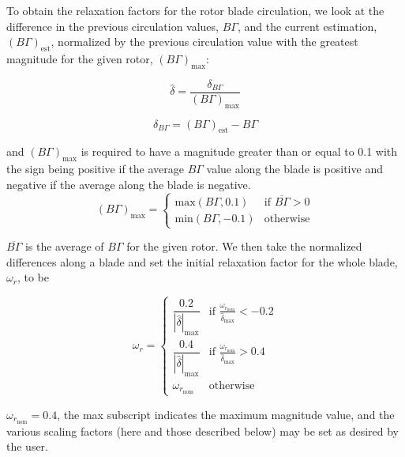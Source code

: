 To obtain the relaxation factors for the rotor blade circulation, we look at the difference in the previous circulation values,
\(B\Gamma\), and the current estimation,
\((B\Gamma)_\text{est}\), normalized by the previous circulation value with the greatest magnitude for the given rotor, \((B\Gamma)_\text{max}\):

\begin{equation}
    \hat{\delta} = \frac{\delta_{B\Gamma}}{(B\Gamma)_\text{max}}
\end{equation}

\where

\begin{equation}
    \delta_{B\Gamma} = (B\Gamma)_\text{est} - B\Gamma
\end{equation}

\noindent and \((B\Gamma)_\text{max}\) is required to have a magnitude greater than or equal to 0.1 with the sign being positive if the average \(B\Gamma\) value along the blade is positive and negative if the average along the blade is negative.
%
\begin{equation}
    (B\Gamma)_\text{max} =
    \begin{cases}
        \text{max}(B\Gamma,0.1) & \text{if } \overline{B\Gamma} > 0 \\
        \text{min}(B\Gamma,-0.1) & \text{otherwise}
    \end{cases}
\end{equation}

\where \(\overline{B\Gamma}\) is the average of \(B\Gamma\) for the given rotor.
%
We then take the normalized differences along a blade and set the initial relaxation factor for the whole blade, \(\omega_r\), to be

\begin{equation}
    \omega_r =
    \begin{cases}
        \dfrac{0.2}{|\hat{\delta}|_\text{max}} & \text{if } \frac{\omega_{r_\text{nom}}}{\hat{\delta}_\text{max}} < -0.2
        \\[10pt]
        \dfrac{0.4}{|\hat{\delta}|_\text{max}} & \text{if } \frac{\omega_{r_\text{nom}}}{\hat{\delta}_\text{max}} > 0.4 \\[10pt]
        \omega_{r_\text{nom}} & \text{otherwise}
    \end{cases}
\end{equation}

\where \(\omega_{r_\text{nom}}=0.4\), the max subscript indicates the maximum magnitude value, and the various scaling factors (here and those described below) may be set as desired by the user.

